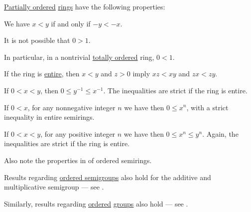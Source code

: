 \begin{proposition}\label{thm:ordered_ring}
  \hyperref[def:ordered_semiring]{Partially ordered} \hyperref[def:ring]{rings} have the following properties:
  \begin{thmenum}
     We have \( x < y \) if and only if \( -y < -x \).

     It is not possible that \( 0 > 1 \).

    In particular, in a nontrivial \hyperref[def:totally_ordered_set]{totally ordered} ring, \( 0 < 1 \).

     If the ring is \hyperref[def:entire_semiring]{entire}, then \( x < y \) and \( z > 0 \) imply \( xz < xy \) and \( zx < zy \).

     If \( 0 < x < y \), then \( 0 \leq y^{-1} \leq x^{-1} \). The inequalities are strict if the ring is entire.

     If \( 0 < x \), for any nonnegative integer \( n \) we have then \( 0 \leq x^n \), with a strict inequality in entire semirings.

     If \( 0 < x < y \), for any positive integer \( n \) we have then \( 0 \leq x^n \leq y^n \). Again, the inequalities are strict if the ring is entire.
  \end{thmenum}
\end{proposition}
\begin{comments}
  \item Also note the properties in  of ordered semirings.

  \item Results regarding \hyperref[def:ordered_semigroup]{ordered semigroups} also hold for the additive and multiplicative semigroup --- see .

  \item Similarly, results regarding \hyperref[def:ordered_semigroup]{ordered} \hyperref[def:group]{groups} also hold --- see .
\end{comments}

